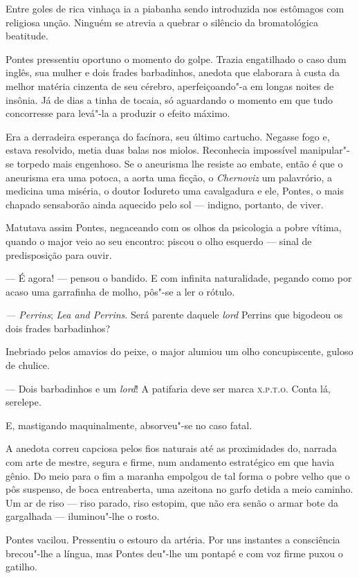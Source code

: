 Entre goles de rica vinhaça ia a piabanha sendo introduzida nos
estômagos com religiosa unção. Ninguém se atrevia a quebrar o silêncio
da bromatológica beatitude.

Pontes pressentiu oportuno o momento do golpe. Trazia engatilhado o caso
dum inglês, sua mulher e dois frades barbadinhos, anedota que elaborara
à custa da melhor matéria cinzenta de seu cérebro, aperfeiçoando"-a em
longas noites de insônia. Já de dias a tinha de tocaia, só aguardando o
momento em que tudo concorresse para levá"-la a produzir o efeito máximo.

Era a derradeira esperança do facínora, seu último cartucho. Negasse
fogo e, estava resolvido, metia duas balas nos miolos. Reconhecia
impossível manipular"-se torpedo mais engenhoso. Se o aneurisma lhe
resiste ao embate, então é que o aneurisma era uma potoca, a aorta uma
ficção, o \emph{Chernoviz} um palavrório, a medicina uma miséria, o
doutor Iodureto uma cavalgadura e ele, Pontes, o mais chapado sensaborão
ainda aquecido pelo sol --- indigno, portanto, de viver.

Matutava assim Pontes, negaceando com os olhos da psicologia a pobre
vítima, quando o major veio ao seu encontro: piscou o olho esquerdo ---
sinal de predisposição para ouvir.

--- É agora! --- pensou o bandido. E com infinita naturalidade, pegando
como por acaso uma garrafinha de molho, pôs"-se a ler o rótulo.

\emph{--- Perrins}; \emph{Lea and Perrins}. Será parente daquele
\emph{lord} Perrins que bigodeou os dois frades barbadinhos?

Inebriado pelos amavios do peixe, o major alumiou um olho concupiscente,
guloso de chulice.

--- Dois barbadinhos e um \emph{lord}! A patifaria deve ser marca
\textsc{x.p.t.o.} Conta lá, serelepe.

E, mastigando maquinalmente, absorveu"-se no caso fatal.

A anedota correu capciosa pelos fios naturais até as proximidades do,
narrada com arte de mestre, segura e firme, num andamento estratégico em
que havia gênio. Do meio para o fim a maranha empolgou de tal forma o
pobre velho que o pôs suspenso, de boca entreaberta, uma azeitona no
garfo detida a meio caminho. Um ar de riso --- riso parado, riso
estopim, que não era senão o armar bote da gargalhada --- iluminou"-lhe o
rosto.

Pontes vacilou. Pressentiu o estouro da artéria. Por uns instantes a
consciência brecou"-lhe a língua, mas Pontes deu"-lhe um pontapé e com voz
firme puxou o gatilho.

